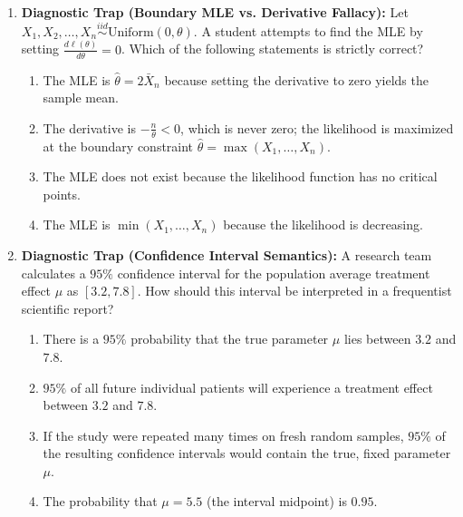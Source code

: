 \begin{enumerate}[resume]
\item \textbf{Diagnostic Trap (Boundary MLE vs. Derivative Fallacy):}
Let $X_1, X_2, \dots, X_n \stackrel{iid}{\sim} \text{Uniform}(0, \theta)$. A student attempts to find the MLE by setting $\frac{d\ell(\theta)}{d\theta} = 0$. Which of the following statements is strictly correct?
\begin{enumerate}
    \item The MLE is $\hat{\theta} = 2\bar{X}_n$ because setting the derivative to zero yields the sample mean.
    \item The derivative is $-\frac{n}{\theta} < 0$, which is never zero; the likelihood is maximized at the boundary constraint $\hat{\theta} = \max(X_1, \dots, X_n)$.
    \item The MLE does not exist because the likelihood function has no critical points.
    \item The MLE is $\min(X_1, \dots, X_n)$ because the likelihood is decreasing.
\end{enumerate}

\item \textbf{Diagnostic Trap (Confidence Interval Semantics):}
A research team calculates a $95\%$ confidence interval for the population average treatment effect $\mu$ as $[3.2, 7.8]$. How should this interval be interpreted in a frequentist scientific report?
\begin{enumerate}
    \item There is a $95\%$ probability that the true parameter $\mu$ lies between $3.2$ and $7.8$.
    \item $95\%$ of all future individual patients will experience a treatment effect between $3.2$ and $7.8$.
    \item If the study were repeated many times on fresh random samples, $95\%$ of the resulting confidence intervals would contain the true, fixed parameter $\mu$.
    \item The probability that $\mu = 5.5$ (the interval midpoint) is $0.95$.
\end{enumerate}
\end{enumerate}
